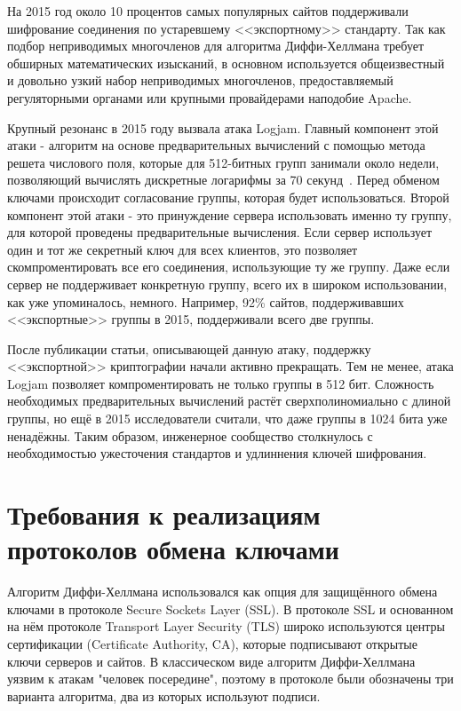 \documentclass[times,specification,annotation]{itmo-student-thesis}
\begin{document}
На 2015 год около 10 процентов самых популярных сайтов поддерживали шифрование соединения по устаревшему <<экспортному>> стандарту.
Так как подбор неприводимых многочленов для алгоритма Диффи-Хеллмана требует обширных математических изысканий,
в основном используется общеизвестный и довольно узкий набор неприводимых многочленов, предоставляемый
регуляторными органами или крупными провайдерами наподобие Apache.

Крупный резонанс в 2015 году вызвала атака Logjam.
Главный компонент этой атаки - алгоритм на основе предварительных вычислений с помощью метода решета числового поля,
которые для 512-битных групп занимали около недели, позволяющий вычислять дискретные логарифмы за 70 секунд~\cite{adr15}.
Перед обменом ключами происходит согласование группы, которая будет использоваться.
Второй компонент этой атаки - это принуждение сервера использовать именно ту группу, для которой проведены предварительные вычисления.
Если сервер использует один и тот же секретный ключ для всех клиентов, это позволяет скомпроментировать все его соединения, использующие ту же группу.
Даже если сервер не поддерживает конкретную группу, всего их в широком использовании, как уже упоминалось, немного.
Например, 92\% сайтов, поддерживавших <<экспортные>> группы в 2015, поддерживали всего две группы.

После публикации статьи, описывающей данную атаку, поддержку <<экспортной>> криптографии начали активно прекращать.
Тем не менее, атака Logjam позволяет компроментировать не только группы в 512 бит.
Сложность необходимых предварительных вычислений растёт сверхполиномиально с длиной группы, но ещё в 2015 исследователи считали,
что даже группы в 1024 бита уже ненадёжны.
Таким образом, инженерное сообщество столкнулось с необходимостью ужесточения стандартов и удлиннения ключей шифрования.

\section{Требования к реализациям протоколов обмена ключами}\label{sec:IETF}

Алгоритм Диффи-Хеллмана использовался как опция для защищённого обмена ключами в протоколе Secure Sockets Layer (SSL).
В протоколе SSL и основанном на нём протоколе Transport Layer Security (TLS) широко используются центры сертификации
(Certificate Authority, CA), которые подписывают открытые ключи серверов и сайтов.
В классическом виде алгоритм Диффи-Хеллмана уязвим к атакам "человек посередине", поэтому в протоколе были
обозначены три варианта алгоритма, два из которых используют подписи.
\end{document}
